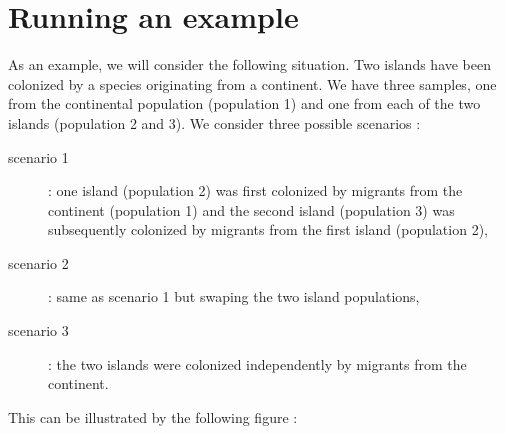 \section{Running an example}
As an example, we will consider the following situation. Two islands have been colonized by a species originating from a continent. We have three samples, one from the continental population (population 1) and one from each of the two islands (population 2 and 3). We consider three possible scenarios :
\begin{description}
\item[scenario 1] : one island (population 2) was first colonized by migrants from the continent (population 1) and the second island (population 3) was subsequently colonized by migrants from the first island (population 2),
\item[scenario 2] : same as scenario 1 but swaping the two island populations,
\item[scenario 3] : the two islands were colonized independently by migrants from the continent.
\end{description}
This can be illustrated by the following figure :
